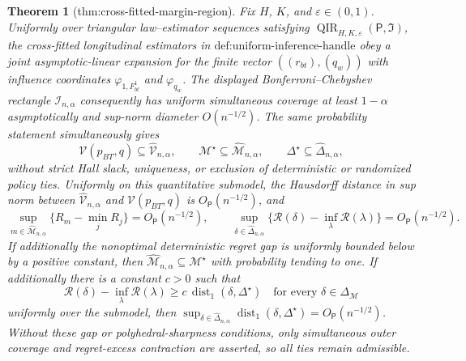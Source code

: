 \documentclass{article}
\newtheorem{theorem}{Theorem}
\begin{document}
\begin{theorem}[thm:cross-fitted-margin-region]\label{thm:cross-fitted-margin-region}
Fix \(H\), \(K\), and \(\varepsilon\in(0,1)\).  Uniformly over triangular law--estimator sequences satisfying \(\operatorname{QIR}_{H,K,\varepsilon}(\mathsf P,\mathfrak I)\), the cross-fitted longitudinal estimators in \(\text{def:uniform-inference-handle}\) obey a joint asymptotic-linear expansion for the finite vector \(((r_{bt}),(q_w))\) with influence coordinates \(\varphi_{1,F_{bt}^1}\) and \(\varphi_{q_w}\).  The displayed Bonferroni--Chebyshev rectangle \(\mathcal I_{n,\alpha}\) consequently has uniform simultaneous coverage at least \(1-\alpha\) asymptotically and sup-norm diameter \(O(n^{-1/2})\).  The same probability statement simultaneously gives
\[
 \mathcal V(p_{BT},q)\subseteq\widehat{\mathcal V}_{n,\alpha},\qquad
 \mathcal M^\star\subseteq\widehat{\mathcal M}_{n,\alpha},\qquad
 \Delta^\star\subseteq\widehat\Delta_{n,\alpha},
\]
without strict Hall slack, uniqueness, or exclusion of deterministic or randomized policy ties.  Uniformly on this quantitative submodel, the Hausdorff distance in sup norm between \(\widehat{\mathcal V}_{n,\alpha}\) and \(\mathcal V(p_{BT},q)\) is \(O_{\mathsf P}(n^{-1/2})\), and
\[
 \sup_{m\in\widehat{\mathcal M}_{n,\alpha}}
   \{R_m-\min_jR_j\}=O_{\mathsf P}(n^{-1/2}),
 \qquad
 \sup_{\delta\in\widehat\Delta_{n,\alpha}}
   \{\mathcal R(\delta)-\inf_\lambda\mathcal R(\lambda)\}
   =O_{\mathsf P}(n^{-1/2}).
\]
If additionally the nonoptimal deterministic regret gap is uniformly bounded below by a positive constant, then \(\widehat{\mathcal M}_{n,\alpha}\subseteq\mathcal M^\star\) with probability tending to one.  If additionally there is a constant \(c>0\) such that
\[
 \mathcal R(\delta)-\inf_\lambda\mathcal R(\lambda)
 \ge c\,\operatorname{dist}_1(\delta,\Delta^\star)
 \quad\text{for every }\delta\in\Delta_{\mathcal M}
\]
uniformly over the submodel, then
\(\sup_{\delta\in\widehat\Delta_{n,\alpha}}
\operatorname{dist}_1(\delta,\Delta^\star)=O_{\mathsf P}(n^{-1/2})\).  Without these gap or polyhedral-sharpness conditions, only simultaneous outer coverage and regret-excess contraction are asserted, so all ties remain admissible.
\end{theorem}
\end{document}
